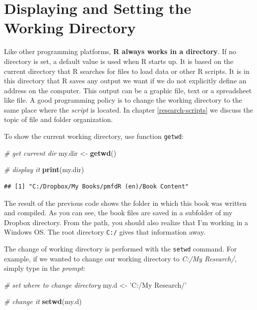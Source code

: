 \documentclass[11pt,]{book}
\newenvironment{Shaded}{\begin{snugshade}}{\end{snugshade}}
\newcommand{\KeywordTok}[1]{\textcolor[rgb]{0.27,0.27,0.27}{\textbf{#1}}}
\newcommand{\StringTok}[1]{\textcolor[rgb]{0.5,0.5,0.5}{#1}}
\newcommand{\CommentTok}[1]{\textcolor[rgb]{0.56,0.35,0.01}{\textit{#1}}}
\newcommand{\NormalTok}[1]{#1}
\begin{document}
\section{Displaying and Setting the Working
Directory}\label{displaying-and-setting-the-working-directory}

Like other programming platforms, \textbf{R always works in a
directory}. If no directory is set, a default value is used when R
starts up. It is based on the current directory that R searches for
files to load data or other R scripts. It is in this directory that R
saves any output we want if we do not explicitly define an address on
the computer. This output can be a graphic file, text or a spreadsheet
like file. A good programming policy is to change the working directory
to the same place where the \emph{script} is located. In chapter
\ref{research-scripts} we discuss the topic of file and folder
organization.

To show the current working directory, use function \texttt{getwd}:

\begin{Shaded}
\begin{Highlighting}[]
\CommentTok{# get current dir}
\NormalTok{my.dir <-}\StringTok{ }\KeywordTok{getwd}\NormalTok{()}

\CommentTok{# display it}
\KeywordTok{print}\NormalTok{(my.dir)}
\end{Highlighting}
\end{Shaded}

\begin{verbatim}
## [1] "C:/Dropbox/My Books/pmfdR (en)/Book Content"
\end{verbatim}

The result of the previous code shows the folder in which this book was
written and compiled. As you can see, the book files are saved in a
subfolder of my Dropbox directory. From the path, you should also
realize that I'm working in a Windows OS. The root directory
\texttt{C:/} gives that information away.

The change of working directory is performed with the \texttt{setwd}
command. For example, if we wanted to change our working directory to
\emph{C:/My Research/}, simply type in the \emph{prompt}:

\begin{Shaded}
\begin{Highlighting}[]
\CommentTok{# set where to change directory}
\NormalTok{my.d <-}\StringTok{ 'C:/My Research/'}

\CommentTok{# change it}
\KeywordTok{setwd}\NormalTok{(my.d)}
\end{Highlighting}
\end{Shaded}
\end{document}
